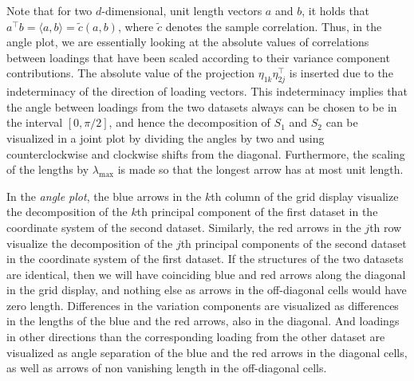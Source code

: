 \documentclass[titlepage,11pt,twoside]{article}
\newcommand{\hl}[1]{\textcolor{magenta}{#1}}
\begin{document}
Note that for two $d$-dimensional, unit length vectors $a$ and $b$, it holds that $ a^\top b = \langle a, b \rangle = \tilde{c}(a,b)$, where $\tilde{c}$ denotes the sample correlation. Thus, in the angle plot, we are essentially looking at the absolute values of correlations between loadings that have been scaled according to their variance component contributions. The absolute value of the projection $\eta_{1k} \eta_{2j}^\top$ is inserted due to the indeterminacy of the direction of loading vectors. This indeterminacy implies that the angle between loadings from the two datasets always can be chosen to be in the interval $[0,\pi/2]$, and hence the decomposition of $S_1$ and $S_2$ can be visualized in a joint plot by dividing the angles by two and using counterclockwise and clockwise shifts from the diagonal. Furthermore, the scaling of the lengths by $\lambda_{\max}$ is made so that the longest arrow has at most unit length.

In the \emph{angle plot}, the blue arrows in the $k$th column of the grid display visualize the decomposition of the $k$th principal component of the first dataset in the coordinate system of the second dataset. Similarly, the red arrows in the $j$th row visualize the decomposition of the $j$th principal components of the second dataset in the coordinate system of the first dataset. %
If the structures of the two datasets are identical, then we will have coinciding blue and red arrows along the diagonal in the grid display, and nothing else as arrows in the off-diagonal cells would have zero length. Differences in the variation components are visualized as differences in the lengths of the blue and the red arrows, also in the diagonal. And loadings in other directions than the corresponding loading from the other dataset are visualized as angle separation of the blue and the red arrows in the diagonal cells, as well as arrows of non vanishing length in the off-diagonal cells.
\end{document}
